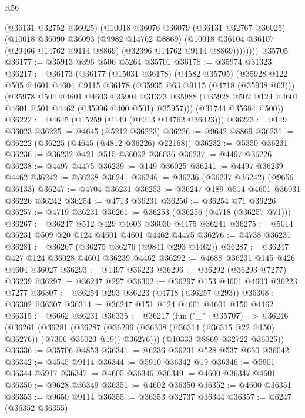 \begin{lexlean}{R56}
\begin{coremodule}
            (@36131 @32752 @36025)
            (@10018
              @36076
              @36079
              (@36131 @32767 @36025)
              (@10018
                @36090
                @36093
                (@9982 @14762 @8869)
                (@10018 @36104 @36107 (@29466 @14762 @9114 @8869) (@32396 @14762 @9114 @8869))))))))
    @35705
@36177 := @35913 @396 @506 @5264 @35701
@36178 := @35974 @31323
@36217 := @36173
    (@36177
      (@15031 @36178)
      (@4582 @35705)
      (@35928
        @122
        @505
        @4601
        @4604
        @9115
        @36178
        (@35935 @63 @9115 (@4718 (@35938 @63)))
        (@35978
          @504
          @4601
          @4603
          @35904
          @31323
          @35988
          (@35928 @502 @124 @4601 @4601 @501 @4462 (@35996 @400 @501) @35957)))
      (@31744 @35684 @500))
@36222 := @4645 (@15259 (@149 (@6213 @14762 @36023)))
@36223 := @149 @36023
@36225 := @4645 (@5212 @36223)
@36226 := @9642 @8869
@36231 := @36222 (@36225 (@4645 (@4812 @36226) @22168))
@36232 := @5350 @36231
@36236 := @36232 @421 @515 @36032 @36036
@36237 := @4497 @36226
@36238 := @4497 @4475
@36239 := @149 @36025
@36241 := @4497 @36239 @4462
@36242 := @36238 @36241
@36246 := @36236 (@36237 @36242) (@9656 @36133)
@36247 := @4704 @36231
@36253 := @36247 @189 @514 @4601 @36031 @36226 @36242
@36254 := @4713 @36231
@36256 := @36254 @71 @36226
@36257 := @4719 @36231
@36261 := @36253 (@36256 (@4718 (@36257 @71)))
@36267 := @36247 @512 @429 @4603 @36030 @4475 @36241
@36275 := @5014 @36231 @509 @20 @124 @4601 @4601 @4462 @4475
@36276 := @4738 @36231
@36281 := @36267 (@36275 @36276 (@9841 @293 @4462))
@36287 := @36247 @427 @124 @36028 @4601 @36239 @4462
@36292 := @4688 @36231 @145 @426 @4604 @36027
@36293 := @4497 @36223
@36296 := @36292 (@36293 @7277) @36239
@36297 := @36247 @297
@36302 := @36297 @153 @4601 @4603 @36223 @7277
@36307 := @36254 @293 @36223 (@4718 (@36257 @293))
@36308 := @36302 @36307
@36314 := @36247 @151 @124 @4601 @4601 @150 @4462
@36315 := @6662 @36231
@36335 := @36217
    (fun ("_" : @35707) =>
    @36246
      (@36261
        (@36281
          (@36287 (@36296 (@36308 (@36314 (@36315 @22 @150) @36276)) (@7306 @36023 @19)) @36276)))
      (@10333 @8869 @32722 @36025))
@36336 := @35706 @4853
@36341 := @6236 @36231 @528 @537 @630 @36042
@36342 := @4545 @9114
@36344 := @5910 @36342 @19
@36346 := @5901 @36344 @5917
@36347 := @4605 @36346
@36349 := @4600 @36347 @4601
@36350 := @9628 @36349
@36351 := @4602 @36350
@36352 := @4600 @36351
@36353 := @9650 @9114
@36355 := @36353 @32737 @36344
@36357 := @6247 (@36352 @36355)

\end{coremodule}
\end{lexlean}
